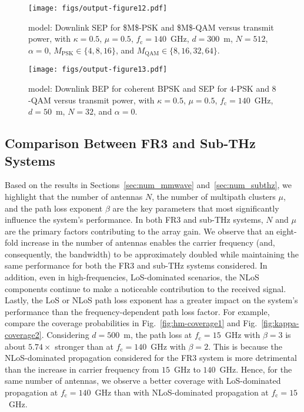 \documentclass[journal,twocolumn]{IEEEtran}
\begin{document}
\begin{figure}[t]
    \centering
    \texttt{[image: figs/output-figure12.pdf]}
    \caption{\km{} model: Downlink \ac{SEP} for \ac{$M$-PSK} and \ac{$M$-QAM} versus transmit power, with $\kappa = 0.5$, $\mu = 0.5$, $f_{\textrm{c}} = 140$~GHz, $d = 300$~m, $N = 512$, $\alpha=0$, $M_{\textrm{PSK}} \in \{4,8,16 \}$, and $M_{\textrm{QAM}} \in \{8,16,32,64\}$.}
    \label{fig:kappa-sep1}
\end{figure}

\begin{figure}[t]
    \centering
    \texttt{[image: figs/output-figure13.pdf]}
    \caption{\km{} model: Downlink \ac{BEP} for coherent \ac{BPSK} and \ac{SEP} for $4$-PSK and $8$-QAM versus transmit power, with $\kappa = 0.5$, $\mu = 0.5$, $f_{\textrm{c}} = 140$~GHz, $d = 50$~m, $N = 32$, and $\alpha=0$.}
    \label{fig:kappa-asympt}
\end{figure}

\subsection{Comparison Between FR3 and Sub-THz Systems}\label{sec:num_comparison}

Based on the results in Sections~\ref{sec:num_mmwave} and~\ref{sec:num_subthz}, we highlight that the number of antennas $N$, the number of multipath clusters $\mu$, and the path loss exponent $\beta$ are the key parameters that most significantly influence the system's performance. In both FR3 and sub-THz systems, $N$ and $\mu$ are the primary factors contributing to the array gain. We observe that an eight-fold increase in the number of antennas enables the carrier frequency (and, consequently, the bandwidth) to be approximately doubled while maintaining the same performance for both the FR3 and sub-THz systems considered. In addition, even in high-frequencies, \ac{LoS}-dominated scenarios, the \ac{NLoS} components continue to make a noticeable contribution to the received signal. Lastly, the \ac{LoS} or \ac{NLoS} path loss exponent has a greater impact on the system's performance than the frequency-dependent path loss factor. For example, compare the coverage probabilities in Fig.~\ref{fig:hm-coverage1} and Fig.~\ref{fig:kappa-coverage2}. Considering $d = 500$~m, the path loss at $f_{\textrm{c}} = 15$~GHz with $\beta = 3$ is about $5.74 \times$ stronger than at $f_{\textrm{c}} = 140$~GHz with $\beta = 2$. This is because the \ac{NLoS}-dominated propagation considered for the FR3 system is more detrimental than the increase in carrier frequency from $15$~GHz to $140$~GHz. Hence, for the same number of antennas, we observe a better coverage with \ac{LoS}-dominated propagation at $f_{\textrm{c}} = 140$~GHz than with \ac{NLoS}-dominated propagation at $f_{\textrm{c}} = 15$~GHz.
\end{document}

